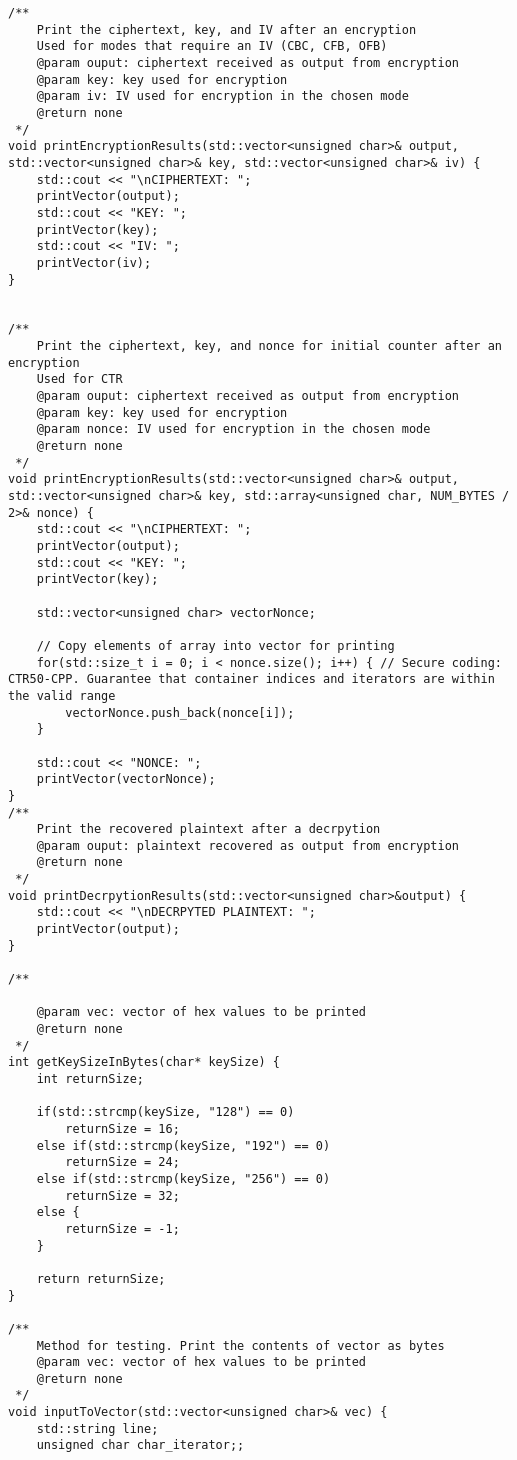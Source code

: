 \documentclass[a4paper,12pt]{article}
\begin{document}
{\begin{lstlisting}
/**
    Print the ciphertext, key, and IV after an encryption
    Used for modes that require an IV (CBC, CFB, OFB)
    @param ouput: ciphertext received as output from encryption
    @param key: key used for encryption
    @param iv: IV used for encryption in the chosen mode
    @return none
 */
void printEncryptionResults(std::vector<unsigned char>& output, std::vector<unsigned char>& key, std::vector<unsigned char>& iv) {
    std::cout << "\nCIPHERTEXT: ";
    printVector(output);
    std::cout << "KEY: ";
    printVector(key);
    std::cout << "IV: ";
    printVector(iv);
}


/**
    Print the ciphertext, key, and nonce for initial counter after an encryption
    Used for CTR
    @param ouput: ciphertext received as output from encryption
    @param key: key used for encryption
    @param nonce: IV used for encryption in the chosen mode
    @return none
 */
void printEncryptionResults(std::vector<unsigned char>& output, std::vector<unsigned char>& key, std::array<unsigned char, NUM_BYTES / 2>& nonce) {
    std::cout << "\nCIPHERTEXT: ";
    printVector(output);
    std::cout << "KEY: ";
    printVector(key);

    std::vector<unsigned char> vectorNonce;

    // Copy elements of array into vector for printing
    for(std::size_t i = 0; i < nonce.size(); i++) { // Secure coding: CTR50-CPP. Guarantee that container indices and iterators are within the valid range
        vectorNonce.push_back(nonce[i]);
    }

    std::cout << "NONCE: ";
    printVector(vectorNonce);
}
/**
    Print the recovered plaintext after a decrpytion
    @param ouput: plaintext recovered as output from encryption
    @return none
 */
void printDecrpytionResults(std::vector<unsigned char>&output) {
    std::cout << "\nDECRPYTED PLAINTEXT: ";
    printVector(output);
}

/**

    @param vec: vector of hex values to be printed
    @return none
 */
int getKeySizeInBytes(char* keySize) {
    int returnSize;

    if(std::strcmp(keySize, "128") == 0)
        returnSize = 16;
    else if(std::strcmp(keySize, "192") == 0)
        returnSize = 24;
    else if(std::strcmp(keySize, "256") == 0)
        returnSize = 32;
    else {
        returnSize = -1;
    }

    return returnSize;
}

/**
    Method for testing. Print the contents of vector as bytes
    @param vec: vector of hex values to be printed
    @return none
 */
void inputToVector(std::vector<unsigned char>& vec) {
    std::string line;
    unsigned char char_iterator;;


\end{lstlisting}}
\end{document}
